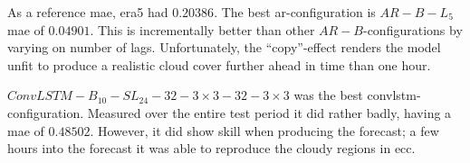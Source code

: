 As a reference \acrshort{mae}, \acrshort{era5} had $0.20386$. 
The best \acrshort{ar}-configuration is $AR-B-L_5$ \acrshort{mae} of $0.04901$. This is incrementally better than other $AR-B$-configurations by varying on number of lags. Unfortunately, the ``copy''-effect renders the model unfit to produce a realistic cloud cover further ahead in time than one hour. 

$ConvLSTM-B_{10}-SL_{24}-32-3\times3-32-3\times3$ was the best \acrshort{convlstm}-configuration. 
Measured over the entire test period it did rather badly, having a \acrshort{mae} of $0.48502$. However, it did show skill when producing the forecast; a few hours into the forecast it was able to reproduce the cloudy regions in \acrshort{ecc}.  




